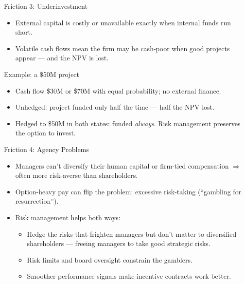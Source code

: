 \documentclass[11pt, aspectratio=169]{beamer}
\begin{document}
\begin{frame}{Friction 3: Underinvestment}
\begin{itemize}
  \item External capital is costly or unavailable exactly when internal funds run short.
  \item Volatile cash flows mean the firm may be cash-poor when good projects appear --- and the NPV is lost.
\end{itemize}
\medskip
\begin{exampleblock}{Example: a \$50M project}
\begin{itemize}
  \item Cash flow \$30M or \$70M with equal probability; no external finance.
  \item Unhedged: project funded only half the time --- half the NPV lost.
  \item Hedged to \$50M in both states: funded \emph{always}. Risk management preserves the option to invest.
\end{itemize}
\end{exampleblock}
\end{frame}

\begin{frame}{Friction 4: Agency Problems}
\begin{itemize}
  \item Managers can't diversify their human capital or firm-tied compensation $\Rightarrow$ often \alert{more risk-averse} than shareholders.
  \item Option-heavy pay can flip the problem: \alert{excessive} risk-taking (``gambling for resurrection'').
  \item Risk management helps both ways:
  \begin{itemize}
    \item Hedge the risks that frighten managers but don't matter to diversified shareholders --- freeing managers to take good strategic risks.
    \item Risk limits and board oversight constrain the gamblers.
    \item Smoother performance signals make incentive contracts work better.
  \end{itemize}
\end{itemize}
\end{frame}
\end{document}
